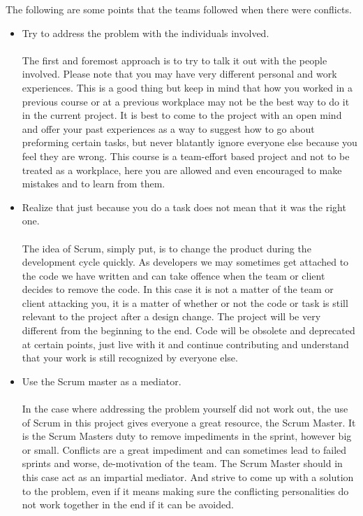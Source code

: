 The following are some points that the teams followed when there were conflicts.
\begin{itemize}
\item Try to address the problem with the individuals involved.\\ \\
The first and foremost approach is to try to talk it out with the people involved. Please note that you may have very different personal and work experiences. This is a good thing but keep in mind that how you worked in a previous course or at a previous workplace may not be the best way to do it in the current project. It is best to come to the project with an open mind and offer your past experiences as a way to suggest how to go about preforming certain tasks, but never blatantly ignore everyone else because you feel they are wrong. This course is a team-effort based project and not to be treated as a workplace, here you are allowed and even encouraged to make mistakes and to learn from them.

\item Realize that just because you do a task does not mean that it was the right one.\\ \\
The idea of Scrum, simply put, is to change the product during the development cycle quickly. As developers we may sometimes get attached to the code we have written and can take offence when the team or client decides to remove the code. In this case it is not a matter of the team or client attacking you, it is a matter of whether or not the code or task is still relevant to the project after a design change. The project will be very different from the beginning to the end. Code will be obsolete and deprecated at certain points, just live with it and continue contributing and understand that your work is still recognized by everyone else.
 \\
\item Use the Scrum master as a mediator.\\ \\
In the case where addressing the problem yourself did not work out, the use of Scrum in this project gives everyone a great resource, the Scrum Master. It is the Scrum Masters duty to remove impediments in the sprint, however big or small. Conflicts are a great impediment and can sometimes lead to failed sprints and worse, de-motivation of the team. The Scrum Master should in this case act as an impartial mediator. And strive to come up with a solution to the problem, even if it means making sure the conflicting personalities do not work together in the end if it can be avoided.

\end{itemize}
